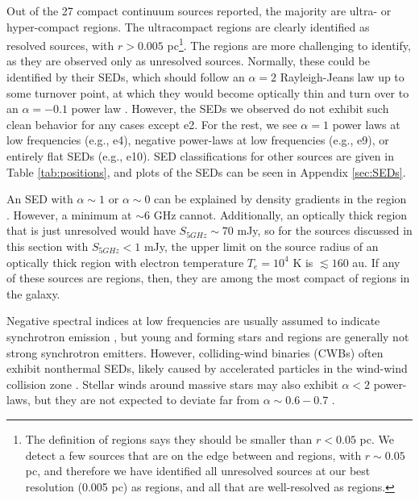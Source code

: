 Out of the 27 compact continuum sources reported, the majority are ultra- or
hyper-compact \hii regions.  The ultracompact \hii regions are clearly
identified as resolved sources, with $r>0.005$ pc\footnote{The
\citet{Kurtz2002a} definition of \hchii regions says they should be smaller
than $r<0.05$ pc.  We detect a few sources that are on the edge between \hchii
and \uchii regions, with $r\sim0.05$ pc, and therefore we have identified all
unresolved sources at our best resolution (0.005 pc) as \hchii regions, and all
that are well-resolved as \uchii regions.}.  The \hchii regions are more
challenging to identify, as they are observed only as unresolved sources.
Normally, these could be identified by their SEDs, which should follow an
$\alpha=2$ Rayleigh-Jeans law up to some turnover point, at which they would
become optically thin and turn over to an $\alpha={-0.1}$ power law
\citep{Wilson2009a}.  However, the SEDs we observed do not exhibit such clean
behavior for any cases except e2.  For the rest, we see $\alpha=1$ power laws
at low frequencies (e.g., e4), negative power-laws at low frequencies (e.g.,
e9), or entirely flat SEDs (e.g., e10).  SED classifications for other sources
are given in Table \ref{tab:positions}, and plots of the SEDs can be seen in
Appendix \ref{sec:SEDs}.

An SED with $\alpha\sim1$ or $\alpha\sim0$ can be explained by density
gradients in the \hii region \citep{Keto2008a,Galvan-Madrid2009a,Tanaka2015a}.
However, a minimum at $\sim6$ GHz cannot.  Additionally, an optically thick
\hii region that is just unresolved would have $S_{5 GHz} \sim 70$ mJy, so for
the sources discussed in this section with $S_{5 GHz} < 1$ mJy, the upper limit
on the source radius of an optically thick \hii region with electron
temperature $T_e=10^4$ K is $\lesssim160$ au.  If any of these sources are \hii
regions, then, they are among the most compact of \hchii regions in the galaxy.

Negative spectral indices at low frequencies are usually assumed to indicate
synchrotron emission \citep{Wilson2009a,Condon2007a}, but young and forming
stars and \hii regions are generally not strong synchrotron emitters.  However,
colliding-wind binaries (CWBs) often exhibit nonthermal SEDs, likely caused by
accelerated particles in the wind-wind collision zone \citep{De-Becker2013a}.
Stellar winds around massive stars may also exhibit $\alpha<2$ power-laws, but
they are not expected to deviate far from $\alpha\sim0.6-0.7$
\citep{Wright1975a,Panagia1975b,Reynolds1986a}.

